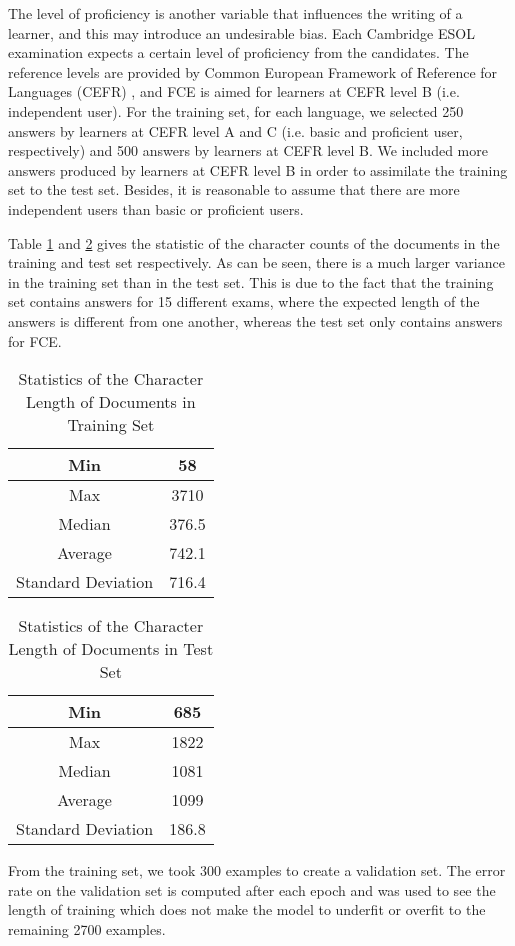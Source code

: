 The level of proficiency is another variable that influences the writing of a learner, and this may introduce an undesirable bias.
Each Cambridge ESOL examination expects a certain level of proficiency from the candidates.
The reference levels are provided by Common European Framework of Reference for Languages (CEFR) \citep{council2001common}, and FCE is aimed for learners at CEFR level B (i.e. independent user).
For the training set, for each language, we selected 250 answers by learners at CEFR level A and C (i.e. basic and proficient user, respectively) and 500 answers by learners at CEFR level B.
We included more answers produced by learners at CEFR level B in order to assimilate the training set to the test set.
Besides, it is reasonable to assume that there are more independent users than basic or proficient users.

Table \ref{tab:tr-stat} and \ref{tab:te-stat} gives the statistic of the character counts of the documents in the training and test set respectively.
As can be seen, there is a much larger variance in the training set than in the test set.
This is due to the fact that the training set contains answers for 15 different exams, where the expected length of the answers is different from one another, whereas the test set only contains answers for FCE.
\begin{table}[h]
\centering
\caption{Statistics of the Character Length of Documents in Training Set}
\label{tab:tr-stat}
\begin{tabular}{|c|c|}
\hline
Min         & 58 \\ \hline
Max      & 3710     \\ \hline
Median    & 376.5    \\ \hline
Average & 742.1   \\ \hline
Standard Deviation    & 716.4   \\ \hline
\end{tabular}
\end{table}
\begin{table}[h]
\centering
\caption{Statistics of the Character Length of Documents in Test Set}
\label{tab:te-stat}
\begin{tabular}{|c|c|}
\hline
Min         & 685\\ \hline
Max      & 1822     \\ \hline
Median    & 1081   \\ \hline
Average & 1099    \\ \hline
Standard Deviation    & 186.8    \\ \hline
\end{tabular}
\end{table}

From the training set, we took 300 examples to create a validation set.
The error rate on the validation set is computed after each epoch and was used to see the length of training which does not make the model to underfit or overfit to the remaining 2700 examples.
